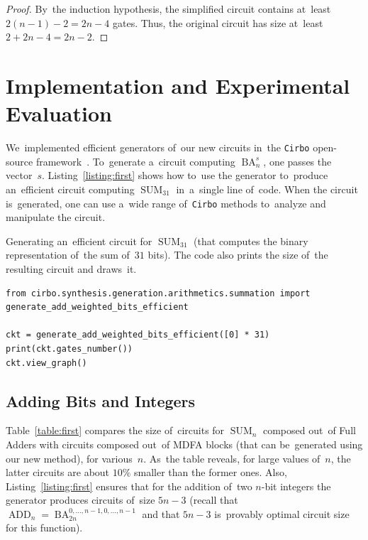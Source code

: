 \documentclass[sigconf, review, anonymous]{acmart}
\DeclareMathOperator{\SUM}{SUM}
\DeclareMathOperator{\ADD}{ADD}
\DeclareMathOperator{\BA}{BA}
\begin{document}
\begin{proof}
	By~the induction hypothesis, the simplified circuit contains at~least $2(n-1)-2=2n-4$ gates. Thus, the original circuit has size at~least $2+2n-4=2n-2$.
\end{proof}


\section{Implementation and Experimental Evaluation}

We~implemented efficient generators of~our new circuits in~the \texttt{Cirbo} open-source framework~\cite{DBLP:conf/aaai/AverkovBEGKKKLL25}. 
To~generate a~circuit computing $\BA_n^s$, one passes the vector~$s$. Listing~\ref{listing:first} shows how to~use the generator
to~produce an~efficient circuit computing $\SUM_{31}$ in~a~single line of~code.
When the circuit is~generated, one can use a~wide range of~\texttt{Cirbo} methods to~analyze and manipulate the circuit.

\begin{listing}
	\caption{Generating an~efficient circuit for $\SUM_{31}$ (that computes the binary representation of~the sum of~$31$ bits). The code also prints the size 
		of~the resulting circuit and draws~it.}
	\label{listing:first}
	\begin{lstlisting}
from cirbo.synthesis.generation.arithmetics.summation import generate_add_weighted_bits_efficient

ckt = generate_add_weighted_bits_efficient([0] * 31)
print(ckt.gates_number())
ckt.view_graph()
	\end{lstlisting}
\end{listing}

\subsection{Adding Bits and Integers}
Table~\ref{table:first} compares the size of~circuits for $\SUM_n$
composed out~of Full Adders with circuits composed out~of MDFA blocks
(that can be~generated using our new method), for various~$n$. As~the table reveals,
for large values of~$n$, the latter circuits are about $10\%$ smaller than the former ones. Also, Listing~\ref{listing:first} ensures that for the addition of~two $n$-bit integers the generator produces circuits of~size $5n-3$ (recall that $\ADD_n=\BA_{2n}^{0,\dotsc,n-1,0,\dotsc,n-1}$ and that $5n-3$ is~provably optimal circuit size for this function).
\end{document}
